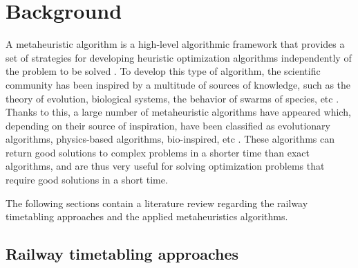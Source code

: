 \documentclass[Afour,sagev,times]{sagej}
\begin{document}
\section{Background}
\label{sec:Background}

A metaheuristic algorithm is a high-level algorithmic framework that provides a set of strategies for developing heuristic optimization algorithms independently of the problem to be solved \cite{Sorensen13}. To develop this type of algorithm, the scientific community has been inspired by a multitude of sources of knowledge, such as the theory of evolution, biological systems, the behavior of swarms of species, etc \cite{delSer19}. Thanks to this, a large number of metaheuristic algorithms have appeared which, depending on their source of inspiration, have been classified as evolutionary algorithms, physics-based algorithms, bio-inspired, etc \cite{Talbi02, Rajwar23}. These algorithms can return good solutions to complex problems in a shorter time than exact algorithms, and are thus very useful for solving optimization problems that require good solutions in a short time.

The following sections contain a literature review regarding the railway timetabling approaches and the applied metaheuristics algorithms.

\subsection{Railway timetabling approaches}
\end{document}
